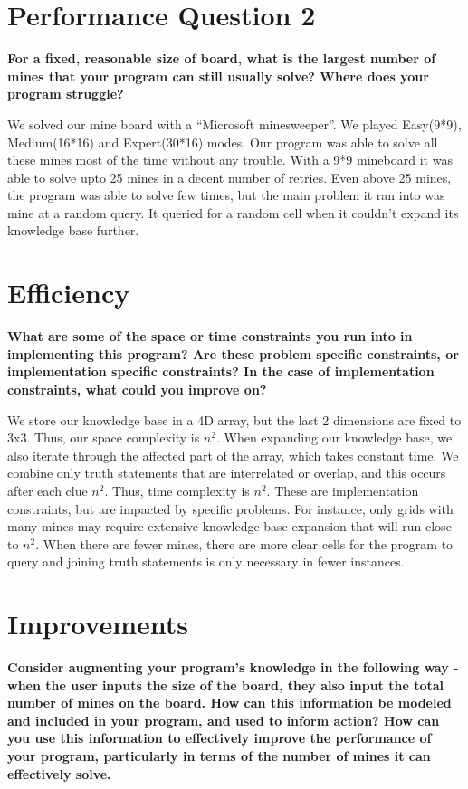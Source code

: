 \documentclass[a4paper]{article}
\begin{document}


\section{Performance Question 2}
\textbf{For a fixed, reasonable size of board, what is the largest number of mines that your program can
still usually solve? Where does your program struggle?}

We solved our mine board with a  ``Microsoft minesweeper''. We played Easy(9*9), Medium(16*16) and Expert(30*16) modes. Our program was able to solve all these mines most of the time without any trouble. With a 9*9 mineboard it was able to solve upto 25 mines in a decent number of retries. Even above 25 mines, the program was able to solve few times, but the main problem it ran into was mine at a random query. It queried for a random cell when it couldn't expand its knowledge base further.

\section{Efficiency}
\textbf{What are some of the space or time constraints you run into in implementing this program? Are these problem specific constraints, or implementation specific constraints? In the case of implementation constraints, what could you improve on?
}

We store our knowledge base in a 4D array, but the last 2 dimensions are fixed to 3x3. Thus, our space complexity is $n^2$. When expanding our knowledge base, we also iterate through the affected part of the array, which takes constant time. We combine only truth statements that are interrelated or overlap, and this occurs after each clue $n^2$. Thus, time complexity is $n^2$. These are implementation constraints, but are impacted by specific problems. For instance, only grids with many mines may require extensive knowledge base expansion that will run close to $n^2$. When there are fewer mines, there are more clear cells for the program to query and joining truth statements is only necessary in fewer instances.

\section{Improvements}
\textbf{Consider augmenting your program's knowledge in the following way - when the user inputs the
size of the board, they also input the total number of mines on the board. How can this information be modeled
and included in your program, and used to inform action? How can you use this information to effectively
improve the performance of your program, particularly in terms of the number of mines it can effectively solve.}
\end{document}
